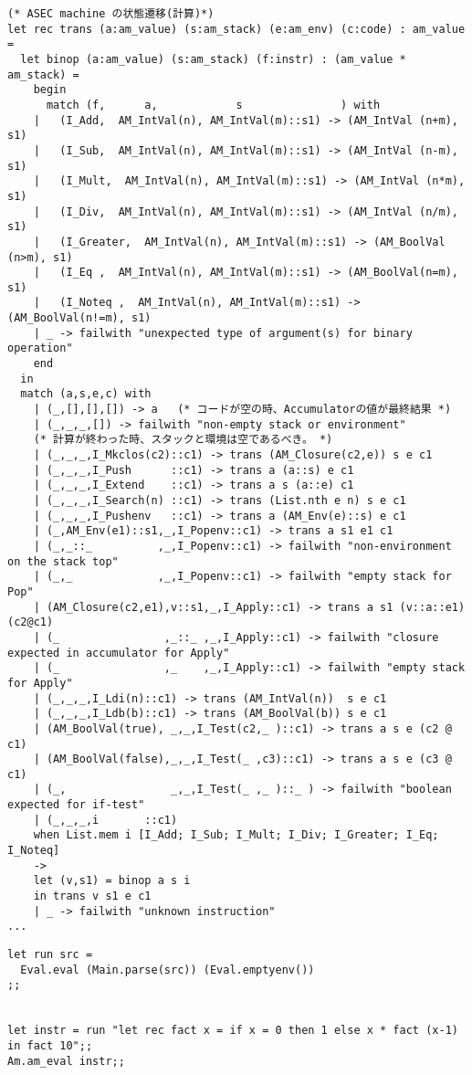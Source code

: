 \documentclass[a4paper,9pt]{jsarticle}
\begin{document}
\begin{lstlisting}[caption=am.ml(抜粋)]
(* ASEC machine の状態遷移(計算)*)
let rec trans (a:am_value) (s:am_stack) (e:am_env) (c:code) : am_value =
  let binop (a:am_value) (s:am_stack) (f:instr) : (am_value * am_stack) =
    begin
      match (f,      a,            s               ) with
	|   (I_Add,  AM_IntVal(n), AM_IntVal(m)::s1) -> (AM_IntVal (n+m), s1)
	|   (I_Sub,  AM_IntVal(n), AM_IntVal(m)::s1) -> (AM_IntVal (n-m), s1)
	|   (I_Mult,  AM_IntVal(n), AM_IntVal(m)::s1) -> (AM_IntVal (n*m), s1)
	|   (I_Div,  AM_IntVal(n), AM_IntVal(m)::s1) -> (AM_IntVal (n/m), s1)
	|   (I_Greater,  AM_IntVal(n), AM_IntVal(m)::s1) -> (AM_BoolVal (n>m), s1)
	|   (I_Eq ,  AM_IntVal(n), AM_IntVal(m)::s1) -> (AM_BoolVal(n=m), s1)
	|   (I_Noteq ,  AM_IntVal(n), AM_IntVal(m)::s1) -> (AM_BoolVal(n!=m), s1)
	| _ -> failwith "unexpected type of argument(s) for binary operation"
    end
  in 
  match (a,s,e,c) with 
    | (_,[],[],[]) -> a   (* コードが空の時、Accumulatorの値が最終結果 *)
    | (_,_,_,[]) -> failwith "non-empty stack or environment"  
	(* 計算が終わった時、スタックと環境は空であるべき。 *)
    | (_,_,_,I_Mkclos(c2)::c1) -> trans (AM_Closure(c2,e)) s e c1
    | (_,_,_,I_Push      ::c1) -> trans a (a::s) e c1
    | (_,_,_,I_Extend    ::c1) -> trans a s (a::e) c1
    | (_,_,_,I_Search(n) ::c1) -> trans (List.nth e n) s e c1
    | (_,_,_,I_Pushenv   ::c1) -> trans a (AM_Env(e)::s) e c1
    | (_,AM_Env(e1)::s1,_,I_Popenv::c1) -> trans a s1 e1 c1
    | (_,_::_          ,_,I_Popenv::c1) -> failwith "non-environment on the stack top"
    | (_,_             ,_,I_Popenv::c1) -> failwith "empty stack for Pop"
    | (AM_Closure(c2,e1),v::s1,_,I_Apply::c1) -> trans a s1 (v::a::e1) (c2@c1)
    | (_                ,_::_ ,_,I_Apply::c1) -> failwith "closure expected in accumulator for Apply"
    | (_                ,_    ,_,I_Apply::c1) -> failwith "empty stack for Apply"
    | (_,_,_,I_Ldi(n)::c1) -> trans (AM_IntVal(n))  s e c1
    | (_,_,_,I_Ldb(b)::c1) -> trans (AM_BoolVal(b)) s e c1
    | (AM_BoolVal(true), _,_,I_Test(c2,_ )::c1) -> trans a s e (c2 @ c1)
    | (AM_BoolVal(false),_,_,I_Test(_ ,c3)::c1) -> trans a s e (c3 @ c1)
    | (_,                _,_,I_Test(_ ,_ )::_ ) -> failwith "boolean expected for if-test"
    | (_,_,_,i       ::c1) 
	when List.mem i [I_Add; I_Sub; I_Mult; I_Div; I_Greater; I_Eq; I_Noteq] 
	-> 
	let (v,s1) = binop a s i
	in trans v s1 e c1
    | _ -> failwith "unknown instruction" 
...
\end{lstlisting}

\begin{lstlisting}
let run src =
  Eval.eval (Main.parse(src)) (Eval.emptyenv())
;;


let instr = run "let rec fact x = if x = 0 then 1 else x * fact (x-1) in fact 10";;
Am.am_eval instr;; 
\end{lstlisting}
\end{document}
